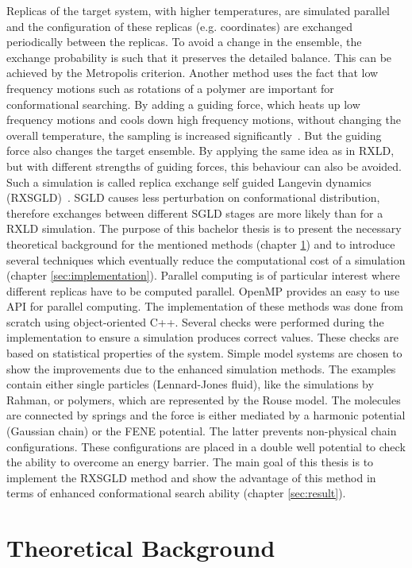 \documentclass[a4paper]{article}
\begin{document}
Replicas of the target system, with higher temperatures, are simulated parallel and the configuration of these replicas (e.g. coordinates) are exchanged periodically between the replicas. To avoid a change in the ensemble, the exchange probability is such that it preserves the detailed balance. This can be achieved by the Metropolis criterion. Another method uses the fact that low frequency motions such as rotations of a polymer are important for conformational searching. By adding a guiding force, which heats up low frequency motions and cools down high frequency motions, without changing the overall temperature, the sampling is increased significantly~\cite{XiongwuWu2003}. But the guiding force also changes the target ensemble. By applying the same idea as in RXLD, but with different strengths of guiding forces, this behaviour can also be avoided. Such a simulation is called replica exchange self guided Langevin dynamics (RXSGLD)~\cite{XiongwuWu2012}. SGLD causes less perturbation on conformational distribution, therefore exchanges between different SGLD stages are more likely than for a RXLD simulation. The purpose of this bachelor thesis is to present the necessary theoretical background for the mentioned methods (chapter \ref{sec:theoretical}) and to introduce several techniques which eventually reduce the computational cost of a simulation (chapter \ref{sec:implementation}). Parallel computing is of particular interest where different replicas have to be computed parallel. OpenMP provides an easy to use API for parallel computing. The implementation of these methods was done from scratch using object-oriented C++. Several checks were performed during the implementation to ensure a simulation produces correct values. These checks are based on statistical properties of the system. Simple model systems are chosen to show the improvements due to the enhanced simulation methods. The examples contain either single particles (Lennard-Jones fluid), like the simulations by Rahman, or polymers, which are represented by the Rouse model. The molecules are connected by springs and the force is either mediated by a harmonic potential (Gaussian chain) or the FENE potential. The latter prevents non-physical chain configurations. These configurations are placed in a double well potential to check the ability to overcome an energy barrier. The main goal of this thesis is to implement the RXSGLD method and show the advantage of this method in terms of enhanced conformational search ability (chapter \ref{sec:result}).

\section{Theoretical Background}
\label{sec:theoretical}
\end{document}

